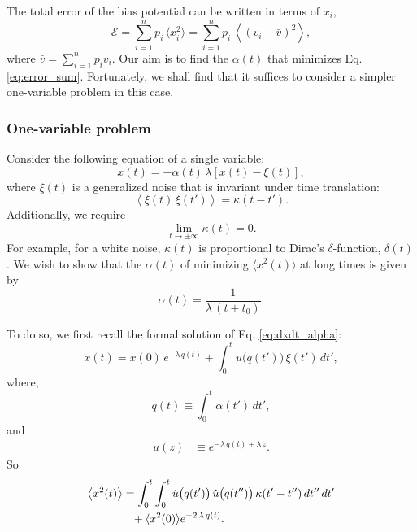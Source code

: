 \documentclass[reprint]{revtex4-1}
\begin{document}
The total error of the bias potential can be written in
terms of $x_i$,
\begin{equation}
\mathcal E
=
\sum_{i = 1}^n p_i \, \langle x_i^2 \rangle
=
\sum_{i = 1}^n p_i \, \left\langle (v_i - \bar v)^2 \right\rangle,
\label{eq:error_sum}
\end{equation}
where
$\bar v = \sum_{i = 1}^n p_i v_i$.
%
Our aim is to find the $\alpha(t)$
that minimizes Eq. \eqref{eq:error_sum}.
%
Fortunately, we shall find that it suffices to consider
a simpler one-variable problem
in this case.



\subsubsection{One-variable problem}



Consider the following equation
of a single variable:
%
\begin{equation}
\dot x(t) = -\alpha(t) \, \lambda \left[ x(t) - \xi(t) \right],
\label{eq:dxdt_alpha}
\end{equation}
%
where $\xi(t)$ is a generalized noise
that is invariant under time translation:
%
\begin{equation}
\left\langle \xi(t) \, \xi(t') \right\rangle
=
\kappa(t - t').
\label{eq:noise_correlation}
\end{equation}
%
Additionally, we require
\begin{equation}
  \lim_{t \rightarrow \pm\infty} \kappa(t) = 0.
  \label{eq:kappat_limit}
\end{equation}
%
For example, for a white noise,
$\kappa(t)$ is proportional to
Dirac's $\delta$-function, $\delta(t)$.
%
We wish to show that the $\alpha(t)$
of minimizing $\langle x^2(t) \rangle$ at long times
is given by
%
\begin{equation}
  \alpha(t) = \frac{1}{\lambda \, (t + t_0)}.
\label{eq:alpha_opt}
\end{equation}



To do so, we first recall
the formal solution of Eq. \eqref{eq:dxdt_alpha}:
%
\begin{equation}
x(t) = x(0) \, e^{-\lambda \, q(t)}
+ \int_0^t \dot u\bigl( q(t') \bigr) \, \xi(t') \, dt',
\label{eq:xt_solution}
\end{equation}
%
where,
%
\begin{equation}
q(t) \equiv \int_0^t \alpha(t') \, dt',
\label{eq:qt_definition}
\end{equation}
%
and
%
\begin{align}
u(z)
&\equiv
e^{-\lambda \, q(t) + \lambda \, z}.
\label{eq:ut_definition}
\end{align}
So
\begin{align}
\left\langle x^2(t) \right\rangle
&=
\int_0^t \int_0^t
  \dot u\bigl( q(t') \bigr) \,
  \dot u\bigl( q(t'') \bigr) \,
  \kappa(t' - t'') \, dt'' \, dt'
\notag
\\
&\hphantom{=}
+\langle x^2(0) \rangle e^{-2 \, \lambda \, q(t)}.
\label{eq:x2t_average}
\end{align}
\end{document}
